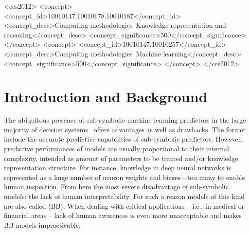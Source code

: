 \documentclass[sigconf]{acmart}
\begin{document}
\begin{CCSXML}
	<ccs2012>
	<concept>
	<concept_id>10010147.10010178.10010187</concept_id>
	<concept_desc>Computing methodologies~Knowledge representation and reasoning</concept_desc>
	<concept_significance>500</concept_significance>
	</concept>
	<concept>
	<concept_id>10010147.10010257</concept_id>
	<concept_desc>Computing methodologies~Machine learning</concept_desc>
	<concept_significance>500</concept_significance>
	</concept>
	</ccs2012>
\end{CCSXML}



\maketitle

\section{Introduction and Background}

The ubiquitous presence of sub-symbolic machine learning predictors in the large majority of decision systems~\cite{rocha2012far} offers advantages as well as drawbacks.
%
The former include the accurate predictive capabilities of sub-symbolic predictors.
%
However, predictive performances of models are usually proportional to their internal complexity, intended as amount of parameters to be trained and/or knowledge representation structure.
%
For instance, knowledge in deep neural networks is represented as a huge number of neuron weights and biases---too many to enable human inspection.
%
From here the most severe disadvantage of sub-symbolic models: the lack of human interpretability.
%
For such a reason models of this kind are also called  (BB).
%
When dealing with critical applications -- i.e., in medical or financial areas -- lack of human awareness is even more unacceptable and makes BB models impracticable.
\end{document}
